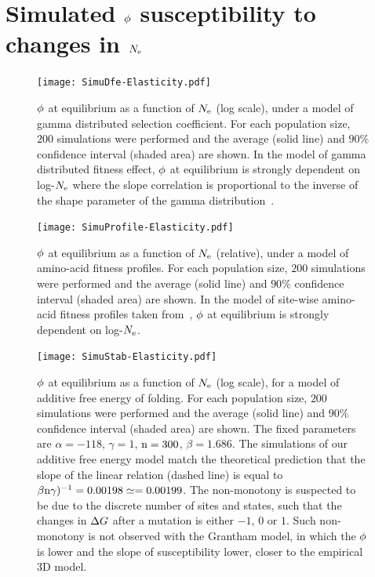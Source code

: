 \section{Simulated \texorpdfstring{$\avgpfix$}{φ} susceptibility to changes in \texorpdfstring{$N_{\mathrm{e}}$}{Nₑ}}

\begin{figure}[H]
	\centering
	\texttt{[image: SimuDfe-Elasticity.pdf]}
	\caption[$\avgpfix$ susceptibility with gamma distributed selection coefficient]{
	$\avgpfix$ at equilibrium as a function of $N_{\mathrm{e}}$ (log scale), under a model of gamma distributed selection coefficient.
	For each population size, $200$ simulations were performed and the average (solid line) and $90\%$ confidence interval (shaded area) are shown.
	In the model of gamma distributed fitness effect, $\avgpfix$ at equilibrium is strongly dependent on log-$N_{\mathrm{e}}$ where the slope correlation is proportional to the inverse of the shape parameter of the gamma distribution~\citep{Welch2008}.
	}
\end{figure}

\begin{figure}[H]
	\centering
	\texttt{[image: SimuProfile-Elasticity.pdf]}
	\caption[$\avgpfix$ susceptibility with amino-acid fitness profiles]{
	$\avgpfix$ at equilibrium as a function of $N_{\mathrm{e}}$ (relative), under a model of amino-acid fitness profiles.
	For each population size, $200$ simulations were performed and the average (solid line) and $90\%$ confidence interval (shaded area) are shown.
	In the model of site-wise amino-acid fitness profiles taken from~\citep{Bloom2017}, $\avgpfix$ at equilibrium is strongly dependent on log-$N_{\mathrm{e}}$.
	}
\end{figure}

\begin{figure}[H]
	\centering
	\texttt{[image: SimuStab-Elasticity.pdf]}
	\caption[$\avgpfix$ susceptibility with additive free energy of folding]{
	$\avgpfix$ at equilibrium as a function of $N_{\mathrm{e}}$ (log scale), for a model of additive free energy of folding.
	For each population size, $200$ simulations were performed and the average (solid line) and $90\%$ confidence interval (shaded area) are shown.
	The fixed parameters are $\alpha=-118$, $\gamma=1$, $\text{n}=300$, $\beta=1.686$.
	The simulations of our additive free energy model match the theoretical prediction that the slope of the linear relation (dashed line) is equal to $\beta \text{n} \gamma)^{-1} = 0.00198 \simeq = 0.00199$.
	The non-monotony is suspected to be due to the discrete number of sites and states, such that the changes in $\Delta G$ after a mutation is either $-1$, $0$ or $1$. Such non-monotony is not observed with the Grantham model, in which the $\avgpfix$ is lower and the slope of susceptibility lower, closer to the empirical 3D model.
	}
\end{figure}

